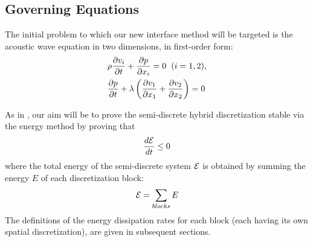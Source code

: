 
\subsection{Governing Equations}

The initial problem to which our new interface method will be targeted is
the acoustic wave equation in two dimensions, in first-order form:
\begin{align}
	&\rho \frac{\partial v_{i}}{\partial t} + \frac{\partial p}{\partial x_{i}} = 0 \hspace{2mm} (i = 1, 2), \label{eq:wave1} \\
	&\frac{\partial p}{\partial t} + \lambda \left(\frac{\partial v_{1}}{\partial x_{1}} + \frac{\partial v_{2}}{\partial x_{2}} \right) = 0 \label{eq:wave2}
\end{align}

As in \cite{kozdon2016stable}, our aim will be to prove the semi-discrete hybrid discretization
stable via the energy method by proving that
\begin{align}
\frac{d\mathcal{E}}{dt} \leq 0
\end{align}
where the total energy of the semi-discrete system $\mathcal{E}$ is obtained by summing the
energy $E$ of each discretization block:
\begin{align}
\mathcal{E} = \sum_{blocks} E
\end{align}
The definitions of the energy dissipation rates for each
block (each having its own spatial discretization), are given in subsequent
sections.

